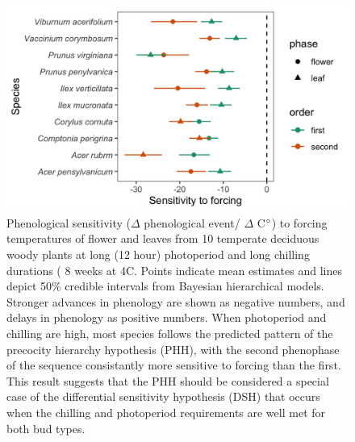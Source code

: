\documentclass[11pt]{article}\usepackage[]{graphicx}\usepackage[]{color}
\begin{document}
\begin{figure}[h!]
    \centering
         \includegraphics[width=.8\textwidth]{..//Plots/Flobuds_manuscript_figs/phh_plot.png}
    \caption{Phenological sensitivity ($\Delta$ phenological event/ $\Delta$ C$\degree$) to forcing temperatures of flower and leaves from 10 temperate deciduous woody plants at long (12 hour) photoperiod and long chilling durations ( 8 weeks at 4\degree C. Points indicate mean estimates and lines depict 50\% credible intervals from Bayesian hierarchical models. Stronger advances in phenology are shown as negative numbers, and delays in phenology as positive numbers. When photoperiod and chilling are high, most species follows the predicted pattern of the precocity hierarchy hypothesis (PHH), with the second phenophase of the sequence consistantly more sensitive to forcing than the first. This result suggests that the PHH should be considered a special case of the differential sensitivity hypothesis (DSH) that occurs when the chilling and photoperiod requirements are well met for both bud types.}
    \label{fig:phh}
\end{figure}
\end{document}
